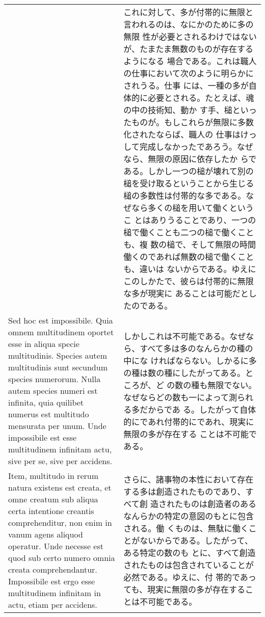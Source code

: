 \documentclass[10pt]{jsarticle} %
\begin{document}
\begin{longtable}{p{21em}p{21em}}
&

これに対して、多が付帯的に無限と言われるのは、なにかのために多の無限
 性が必要とされるわけではないが、たまたま無数のものが存在するようになる
 場合である。これは職人の仕事において次のように明らかにされうる。仕事
 には、一種の多が自体的に必要とされる。たとえば、魂の中の技術知、動か
 す手、槌といったものが。もしこれらが無限に多数化されたならば、職人の
 仕事はけっして完成しなかったであろう。なぜなら、無限の原因に依存したか
 らである。しかし一つの槌が壊れて別の槌を受け取るということから生じる
 槌の多数性は付帯的な多である。なぜなら多くの槌を用いて働くというこ
 とはありうることであり、一つの槌で働くことも二つの槌で働くことも、複
 数の槌で、そして無限の時間働くのであれば無数の槌で働くことも、違いは
 ないからである。ゆえにこのしかたで、彼らは付帯的に無限な多が現実に
 あることは可能だとしたのである。

\\


Sed hoc est impossibile. Quia omnem multitudinem oportet esse in aliqua
 specie multitudinis. Species autem multitudinis sunt secundum species
 numerorum. Nulla autem species numeri est infinita, quia quilibet
 numerus est multitudo mensurata per unum. Unde impossibile est esse
 multitudinem infinitam actu, sive per se, sive per accidens.

&

しかしこれは不可能である。なぜなら、すべて多は多のなんらかの種の中にな
 ければならない。しかるに多の種は数の種にしたがってある。ところが、ど
 の数の種も無限でない。なぜならどの数も一によって測られる多だからであ
 る。したがって自体的にであれ付帯的にであれ、現実に無限の多が存在する
 ことは不可能である。


\\

Item, multitudo in rerum natura existens est creata, et omne creatum sub
 aliqua certa intentione creantis comprehenditur, non enim in vanum
 agens aliquod operatur. Unde necesse est quod sub certo numero omnia
 creata comprehendantur. Impossibile est ergo esse multitudinem
 infinitam in actu, etiam per accidens.

&

さらに、諸事物の本性において存在する多は創造されたものであり、すべて創
 造されたものは創造者のあるなんらかの特定の意図のもとに包含される。働
 くものは、無駄に働くことがないからである。したがって、ある特定の数のも
 とに、すべて創造されたものは包含されていることが必然である。ゆえに、付
 帯的であっても、現実に無限の多が存在することは不可能である。



\end{longtable}
\end{document}
